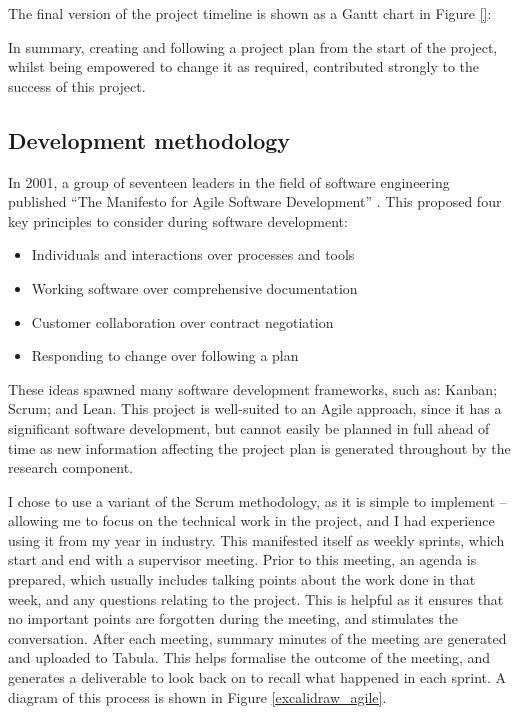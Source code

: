 The final version of the project timeline is shown as a Gantt chart in Figure \ref{}:


In summary, creating and following a project plan from the start of the project, whilst being empowered to change it as required, contributed strongly to the success of this project.

\subsection{Development methodology}
\label{ssec:organisation-methodology}


In 2001, a group of seventeen leaders in the field of software engineering published ``The Manifesto for Agile Software Development'' \cite{beckManifestoAgileSoftware2001}. This proposed four key principles to consider during software development:

\begin{itemize}
    \item Individuals and interactions over processes and tools
    \item Working software over comprehensive documentation
    \item Customer collaboration over contract negotiation
    \item Responding to change over following a plan
\end{itemize}

These ideas spawned many software development frameworks, such as: Kanban; Scrum; and Lean. This project is well-suited to an Agile approach, since it has a significant software development, but cannot easily be planned in full ahead of time as new information affecting the project plan is generated throughout by the research component.

I chose to use a variant of the Scrum methodology, as it is simple to implement -- allowing me to focus on the technical work in the project, and I had experience using it from my year in industry. This manifested itself as weekly sprints, which start and end with a supervisor meeting. Prior to this meeting, an agenda is prepared, which usually includes talking points about the work done in that week, and any questions relating to the project. This is helpful as it ensures that no important points are forgotten during the meeting, and stimulates the conversation. After each meeting, summary minutes of the meeting are generated and uploaded to Tabula. This helps formalise the outcome of the meeting, and generates a deliverable to look back on to recall what happened in each sprint. A diagram of this process is shown in Figure \ref{excalidraw_agile}.

